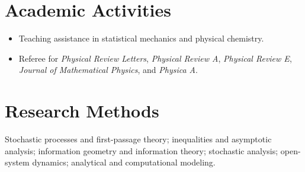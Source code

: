 \documentclass[10pt,a4paper]{article}
\begin{document}
\section{Academic Activities}

\begin{itemize}
  \item Teaching assistance in statistical mechanics and physical chemistry.
  \item Referee for \emph{Physical Review Letters}, \emph{Physical Review A}, \emph{Physical Review E}, \emph{Journal of Mathematical Physics}, and \emph{Physica A}.
\end{itemize}

\section{Research Methods}

Stochastic processes and first-passage theory; inequalities and asymptotic analysis; information geometry and information theory; stochastic analysis; open-system dynamics; analytical and computational modeling.
\end{document}
